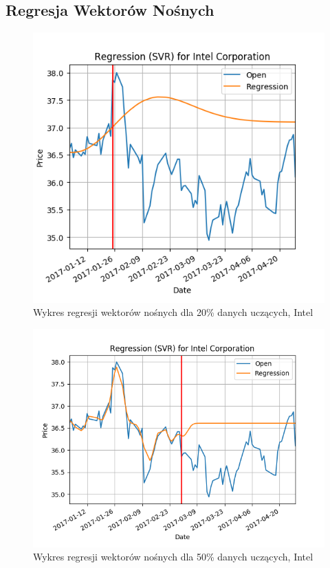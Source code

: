 \subsection{Regresja Wektorów Nośnych}

\begin{figure}[h!]
\centering
\includegraphics[width=150mm]{pictures/plots/intel_svr_20.png}
\caption{Wykres regresji wektorów nośnych dla 20\% danych uczących, Intel}
\label{fig:Wykres regresji wektorów nośnych dla 20\% danych uczących, Intel}
\end{figure}

\begin{figure}[h!]
\centering
\includegraphics[width=150mm]{pictures/plots/intel_svr_50.png}
\caption{Wykres regresji wektorów nośnych dla 50\% danych uczących, Intel}
\label{fig:Wykres regresji wektorów nośnych dla 50\% danych uczących, Intel}
\end{figure}

